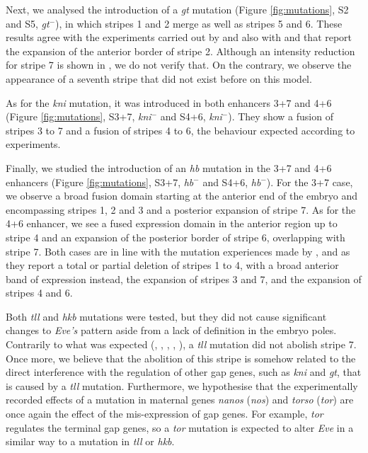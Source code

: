 \documentclass[final,authoryear, 5p, times]{elsarticle}
\begin{document}
Next, we analysed the introduction of a \textit{gt} mutation (Figure \ref{fig:mutations}, S2 and S5, \textit{gt}$^-$), in which stripes 1 and 2 merge as well as stripes 5 and 6. These results agree with the experiments carried out by \cite{Frash_correct} and also with \cite{Small1991} and \cite{Stano} that report the expansion of the anterior border of stripe 2. Although an intensity reduction for stripe 7 is shown in \cite{Frash_correct}, we do not verify that. On the contrary, we observe the appearance of a seventh stripe that did not exist before on this model.



As for the \textit{kni} mutation, it was introduced in both enhancers 3+7 and 4+6 (Figure \ref{fig:mutations}, S3+7, \textit{kni}$^-$ and S4+6, \textit{kni}$^-$). They show a fusion of stripes 3 to 7 and a fusion of stripes 4 to 6, the behaviour expected according to \cite{Surkova2013} experiments.

Finally, we studied the introduction of an \textit{hb} mutation in the 3+7 and 4+6 enhancers (Figure \ref{fig:mutations}, S3+7, \textit{hb}$^-$ and S4+6, \textit{hb}$^-$). For the 3+7 case, we observe a broad fusion domain starting at the anterior end of the embryo and encompassing stripes 1, 2 and 3 and a posterior expansion of stripe 7. As for the 4+6 enhancer, we see a fused expression domain in the anterior region up to stripe 4 and an expansion of the posterior border of stripe 6, overlapping with stripe 7. Both cases are in line with the mutation experiences made by \cite{Frash_correct}, \cite{SMALL1996314} and \cite{Fuji} as they report a total or partial deletion of stripes 1 to 4, with a broad anterior band of expression instead, the expansion of stripes 3 and 7, and the expansion of stripes 4 and 6.


Both \textit{tll} and \textit{hkb} mutations were tested, but they did not cause significant changes to \textit{Eve's} pattern aside from a lack of definition in the embryo poles. Contrarily to what was expected (\cite{SMALL1996314}, \cite{Frash_correct}, \cite{Fuji}, \cite{Janssens2013}, \cite{Ilsley2013}), a \textit{tll} mutation did not abolish stripe 7. Once more, we believe that the abolition of this stripe is somehow related to the direct interference with the regulation of other gap genes, such as \textit{kni} and \textit{gt}, that is caused by a \textit{tll} mutation. Furthermore, we hypothesise that the experimentally recorded effects of a mutation in maternal genes \textit{nanos} (\textit{nos}) and \textit{torso} (\textit{tor}) are once again the effect of the mis-expression of gap genes. For example, \textit{tor} regulates the terminal gap genes, so a \textit{tor} mutation is expected to alter \textit{Eve} in a similar way to a mutation in \textit{tll} or \textit{hkb}. 
\end{document}
